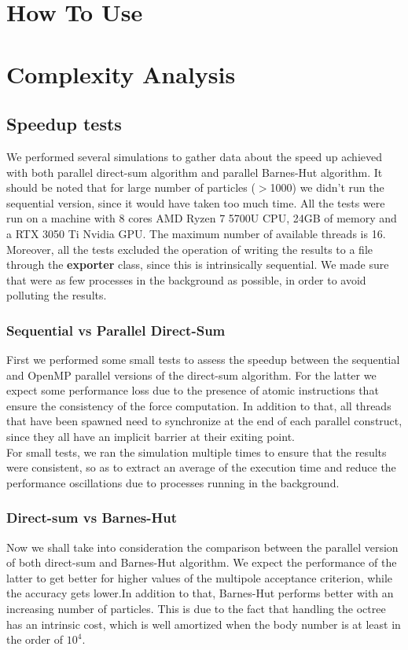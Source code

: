 \documentclass{article}
\begin{document}
\section{How To Use}

\section{Complexity Analysis}
\subsection{Speedup tests}
We performed several simulations to gather data about the speed up achieved with both parallel direct-sum algorithm and parallel Barnes-Hut algorithm. It should be noted that for large number of particles ($>$1000) we didn't run the sequential version, since it would have taken too much time. 
All the tests were run on a machine with 8 cores AMD Ryzen 7 5700U CPU, 24GB of memory and a RTX 3050 Ti Nvidia GPU. The maximum number of available threads is 16.
Moreover, all the tests excluded the operation of writing the results to a file through the \textbf{exporter} class, since this is intrinsically sequential. We made sure that were as few processes in the background as possible, in order to avoid polluting the results. \\
\subsubsection{Sequential vs Parallel Direct-Sum} First we performed some small tests to assess the speedup between the sequential and OpenMP parallel versions of the direct-sum algorithm. For the latter we expect some performance loss due to the presence of atomic instructions that ensure the consistency of the force computation. In addition to that, all threads that have been spawned need to synchronize at the end of each parallel construct, since they all have an implicit barrier at their exiting point. \\
For small tests, we ran the simulation multiple times to ensure that the results were consistent, so as to extract an average of the execution time and reduce the performance oscillations due to processes running in the background. \\

\subsubsection{Direct-sum vs Barnes-Hut}
Now we shall take into consideration the comparison between the parallel version of both direct-sum and Barnes-Hut algorithm. We expect the performance of the latter to get better for higher values of the multipole acceptance criterion, while the accuracy gets lower.In addition to that, Barnes-Hut performs better with an increasing number of particles. This is due to the fact that handling the octree has an intrinsic cost, which is well amortized when the body number is at least in the order of $10^4$.
\end{document}
